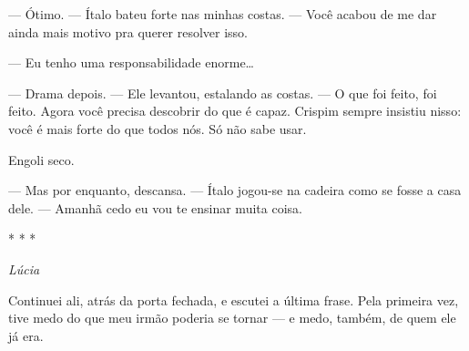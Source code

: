— Ótimo. — Ítalo bateu forte nas minhas costas. — Você acabou de me dar ainda mais motivo pra querer resolver isso.

— Eu tenho uma responsabilidade enorme…

— Drama depois. — Ele levantou, estalando as costas. — O que foi feito, foi feito.  
Agora você precisa descobrir do que é capaz.  
Crispim sempre insistiu nisso: você é mais forte do que todos nós.  
Só não sabe usar.

Engoli seco.

— Mas por enquanto, descansa. — Ítalo jogou-se na cadeira como se fosse a casa dele. — Amanhã cedo eu vou te ensinar muita coisa.

\begin{center}
* * *

\textit{Lúcia}
\end{center}

Continuei ali, atrás da porta fechada, e escutei a última frase.
Pela primeira vez, tive medo do que meu irmão poderia se tornar — e medo, também, de quem ele já era.

